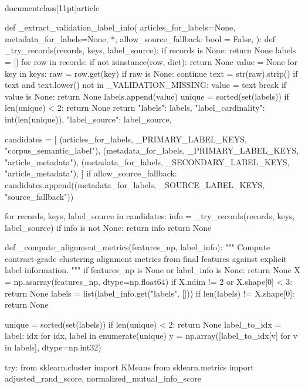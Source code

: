 \\documentclass[11pt]{article}
\begin{document}
\begin{CodeBlock}
def _extract_validation_label_info(
    articles_for_labels=None,
    metadata_for_labels=None,
    *,
    allow_source_fallback: bool = False,
):
    def _try_records(records, keys, label_source):
        if records is None:
            return None
        labels = []
        for row in records:
            if not isinstance(row, dict):
                return None
            value = None
            for key in keys:
                raw = row.get(key)
                if raw is None:
                    continue
                text = str(raw).strip()
                if text and text.lower() not in _VALIDATION_MISSING:
                    value = text
                    break
            if value is None:
                return None
            labels.append(value)
        unique = sorted(set(labels))
        if len(unique) < 2:
            return None
        return {
            "labels": labels,
            "label_cardinality": int(len(unique)),
            "label_source": label_source,
        }

    candidates = [
        (articles_for_labels, _PRIMARY_LABEL_KEYS, "corpus_semantic_label"),
        (metadata_for_labels, _PRIMARY_LABEL_KEYS, "article_metadata"),
        (metadata_for_labels, _SECONDARY_LABEL_KEYS, "article_metadata"),
    ]
    if allow_source_fallback:
        candidates.append((metadata_for_labels, _SOURCE_LABEL_KEYS, "source_fallback"))

    for records, keys, label_source in candidates:
        info = _try_records(records, keys, label_source)
        if info is not None:
            return info
    return None


def _compute_alignment_metrics(features_np, label_info):
    """
    Compute contract-grade clustering alignment metrics from final features
    against explicit label information.
    """
    if features_np is None or label_info is None:
        return None
    X = np.asarray(features_np, dtype=np.float64)
    if X.ndim != 2 or X.shape[0] < 3:
        return None
    labels = list(label_info.get("labels", []))
    if len(labels) != X.shape[0]:
        return None

    unique = sorted(set(labels))
    if len(unique) < 2:
        return None
    label_to_idx = {label: idx for idx, label in enumerate(unique)}
    y = np.array([label_to_idx[v] for v in labels], dtype=np.int32)

    try:
        from sklearn.cluster import KMeans
        from sklearn.metrics import adjusted_rand_score, normalized_mutual_info_score


\end{CodeBlock}
\end{document}
